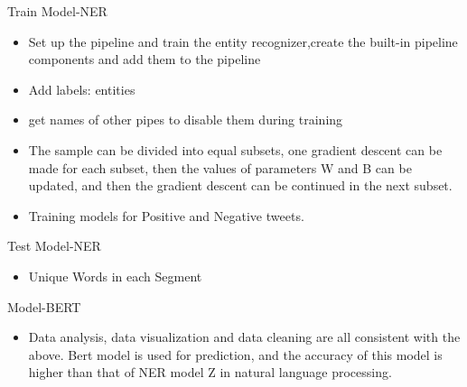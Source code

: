 \documentclass[
 size=14pt,
 paper=smartboard,  %
 mode=present, 		%
 display=slides, 	%
 style=tuliplab,  	%
 pauseslide,
 fleqn,leqno]{powerdot}
\begin{document}
\begin{slide}[toc=,bm=]{Train Model-NER}
\begin{itemize}
\item
Set up the pipeline and train the entity recognizer,create the built-in pipeline components and add them to the pipeline
\item
Add labels: entities
\item
get names of other pipes to disable them during training
\item
The sample can be divided into equal subsets, one gradient descent can be made for each subset, then the values of parameters W and B can be updated, and then the gradient descent can be continued in the next subset.
\item
Training models for Positive and Negative tweets.
\end{itemize}
\end{slide}
\begin{slide}[toc=,bm=]{Test Model-NER}
\begin{itemize}
\item
Unique Words in each Segment
\end{itemize}
\vspace{-0.8cm}
\begin{figure}[htbp]
\centering
{}%
%
\centering
\end{figure}
\end{slide}


\begin{slide}[toc=,bm=]{Model-BERT}
\begin{itemize}
\item
Data analysis, data visualization and data cleaning are all consistent with the above. Bert model is used for prediction, and the accuracy of this model is higher than that of NER model Z in natural language processing.
\end{itemize}
\end{slide}
\end{document}
